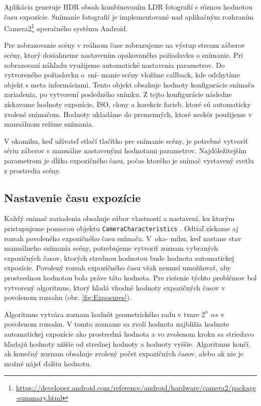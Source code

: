 \documentclass[slovak]{ExcelAtFIT}
\begin{document}
Aplikácia generuje HDR obsah kombinovaním LDR fotografií s rôznou hodnotou času expozície.
Snímanie fotografií je implementované nad aplikačným rozhraním
Camera2\footnote{\url{https://developer.android.com/reference/android/hardware/camera2/package-summary.html}}
operačného systému Android.

Pre zobrazovanie scény v reálnom čase zobrazujeme na výstup stream záberov scény, ktorý dosiahneme nastavením
opakovaného požiadavku o snímanie. Pri zobrazovaní náhľadu využijeme automatické nastavenia
parametrov. Do vytvoreného požiadavku o~sní- manie scény vložíme callback, kde odchytíme objekt s meta informáciami.
Tento objekt obsahuje hodnoty konfigurácie snímača zariadenia, po vytvorení posledného snímku. Z tejto
konfigurácie následne získavame hodnoty expozície, ISO, clony a korekcie farieb, ktoré sú automaticky zvolené
snímačom. Hodnoty ukladáme do premenných, ktoré neskôr použijeme v manuálnom režime snímania.

V okamihu, keď užívateľ stlačí tlačítko pre snímanie scény, je potrebné vytvoriť sériu záberov s manuálne nastavenými
hodnotami parametrov. Najdôležitejším parametrom je dĺžka expozičného času, počas ktorého je snímač vystavený svetlu
z prostredia scény.

\subsection*{Nastavenie času expozície}

Každý snímač zariadenia obsahuje súbor vlastností a nastavení, ku ktorým pristupujeme pomocou
objektu \texttt{CameraCharacteristics} \cite{Android}. Odtiaľ získame aj rozsah povoleného expozičného
času snímača. V~oka- mihu, keď nastane stav manuálneho snímania scény, potrebujeme vytvoriť zoznam
vybraných expozičných časov, ktorých strednou hodnotou bude hodnota automatickej expozície. Povolený
rozsah expozičného času však nemusí umožňovať, aby prostrednou hodnotou bola práve táto hodnota.
Pre riešenie týchto problémov bol vytvorený algoritmus, ktorý hľadá vhodné hodnoty expozičných
časov v povolenom rozsahu (obr. \ref{fig:Exposures}).

Algoritmus vytvára zoznam hodnôt geometrického radu v tvare $2^{n}$ $ns$ v povolenom rozsahu.
V tomto zozname sa zvolí hodnota najbližia hodnote automatickej expozície ako prostredná hodnota
a vo zvolenom kroku sa striedavo hľadajú hodnoty nižšie od strednej hodnoty a hodnoty vyššie.
Algoritmus končí, ak konečný zoznam obsahuje zvolený počet expozičných časov, alebo ak nie je
možné nájsť ďalšiu hodnotu.
\end{document}

